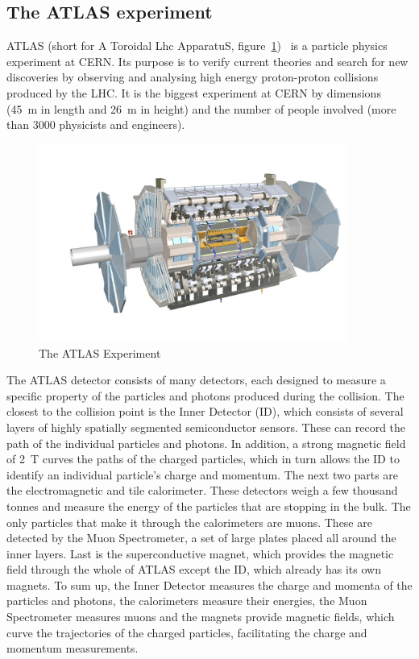\subsection{The ATLAS experiment}
ATLAS (short for A Toroidal Lhc ApparatuS, figure~\ref{fig:atlas})~\cite{} is a particle physics experiment at CERN. Its purpose is to verify current theories and search for new discoveries by observing and analysing high energy proton-proton collisions produced by the LHC. It is the biggest experiment at CERN by dimensions (45~m in length and 26~m in height) and the number of people involved (more than 3000 physicists and engineers).
\begin{figure}[!t]
\centering
\includegraphics[width=0.9\textwidth]{01_introduction/pics/atlas3}
\caption{The ATLAS Experiment \cite{Pequenao:1095924}}
\label{fig:atlas}
\end{figure}
The ATLAS detector consists of many detectors, each designed to measure a specific property of the particles and photons produced during the collision. The closest to the collision point is the Inner Detector (ID), which consists of several layers of highly spatially segmented semiconductor sensors. These can record the path of the individual particles and photons. In addition, a strong magnetic field of 2~T curves the paths of the charged particles, which in turn allows the ID to identify an individual particle's charge and momentum. The next two parts are the electromagnetic and tile calorimeter. These detectors weigh a few thousand tonnes and measure the energy of the particles that are stopping in the bulk. The only particles that make it through the calorimeters are muons. These are detected by the Muon Spectrometer, a set of large plates placed all around the inner layers. Last is the superconductive magnet, which provides the magnetic field through the whole of ATLAS except the ID, which already has its own magnets. To sum up, the Inner Detector measures the charge and momenta of the particles and photons, the calorimeters measure their energies, the Muon Spectrometer measures muons and the magnets provide magnetic fields, which curve the trajectories of the charged particles, facilitating the charge and momentum measurements.

